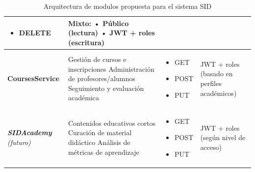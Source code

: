 \documentclass[11pt,a4paper]{article}
\newcommand{\future}[1]{\textit{#1}}
\begin{document}
\begin{table}[H]
\begin{tabular}{>{\raggedright\arraybackslash}p{2.8cm} >{\raggedright\arraybackslash}p{5.0cm} >{\raggedright\arraybackslash}p{3.0cm} >{\raggedright\arraybackslash}p{3.0cm}}
\begin{itemize}[nosep,leftmargin=*]
			\item DELETE
		\end{itemize}        &
		Mixto:\newline
		• Público (lectura)\newline
		• JWT + roles (escritura)                                                                                                          \\
		\midrule
		\rowcolor{rowcolor1}
		\textbf{CoursesService}                    &
		Gestión de cursos e inscripciones\newline
		Administración de profesores/alumnos\newline
		Seguimiento y evaluación académica         &
		\begin{itemize}[nosep,leftmargin=*]
			\item GET
			\item POST
			\item PUT
		\end{itemize}        &
		JWT + roles\newline
		(basado en perfiles académicos)                                                                                                    \\
		\midrule
		\rowcolor{rowcolor2}
		\textbf{\future{SIDAcademy}}\newline
		\textit{(futuro)}                          &
		Contenidos educativos cortos\newline
		Curación de material didáctico\newline
		Análisis de métricas de aprendizaje        &
		\begin{itemize}[nosep,leftmargin=*]
			\item GET
			\item POST
			\item PUT
		\end{itemize}        &
		JWT + roles\newline
		(según nivel de acceso)                                                                                                            \\
		\bottomrule
	\end{tabular}
	\caption{Arquitectura de modulos propuesta para el sistema SID}
\end{table}
\end{document}
